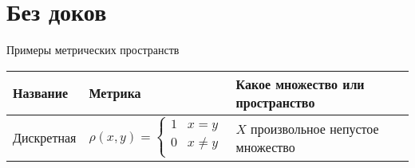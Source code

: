 
\newcommand{\br}{\geqslant}
\newcommand{\mr }{\leqslant}
\newcommand{\mes}{\{X, \rho\}}
\newcommand{\MS}{Пусть $\{X, \rho\}$~--метрическое пространство}
\newcommand{\tttk}{тогда и только тогда, когда }
\newcommand{\Rnp}{\mathbb{R}^n_p}
\newcommand{\crk}{^{\circ}}
\linespread{1.15}
\usepackage{xhfill}

\pagestyle{empty}
\section*{Без  доков}

Примеры метрических пространств

{\setlength{\extrarowheight}{5pt}
\begin{tabularx}{\textwidth}{||l|l|X||}

    \hline
    Название               & Метрика                                                                    & Какое множество или пространство                                                                                         \\
    \hline

    Дискретная             & $
        \rho (x, y) =
    \begin{cases}
            1 & x=y      \\
            0 & x \neq y \\
        \end{cases}$        & $X$ произвольное непустое множество

    \\
    \hline


\end{tabularx}}
